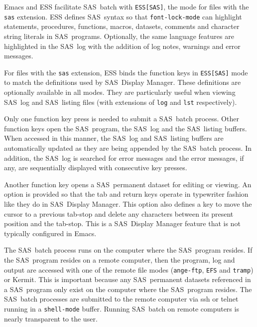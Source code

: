 \documentclass{article}
\newcommand*{\SAS}{\textsc{SAS}}
\newcommand{\stexttt}[1]{{\small\texttt{#1}}}
\newenvironment{Comment}{\begin{quote}\small\itshape }{\end{quote}}
\begin{document}
Emacs and ESS facilitate \SAS\ batch with \stexttt{ESS[SAS]}, the mode 
for files with the \stexttt{sas} extension.  ESS defines \SAS\ syntax so that
\stexttt{font-lock-mode} can highlight statements, procedures,
functions, macros, datasets, comments and character string literals in
\SAS\ programs.  Optionally, the same language features are
highlighted in the \SAS\ log with the addition of log notes, warnings
and error messages.

For files with the \stexttt{sas} extension, ESS binds the function
keys in \stexttt{ESS[SAS]} mode to match the definitions used by \SAS\ 
Display Manager.  These definitions are optionally available in all
modes.   They are particularly useful when viewing \SAS\ log and \SAS\ listing
files (with extensions of \stexttt{log} and \stexttt{lst}
respectively).

Only one function key press is needed to submit a \SAS\ batch process.
Other function keys open the \SAS\ program, the \SAS\ log and the
\SAS\ listing buffers.  When accessed in this manner, the \SAS\ log and 
\SAS\ listing buffers are automatically updated as they are being appended 
by the \SAS\ batch process.  In addition, the \SAS\ log is searched for error
messages and the error messages, if any, are sequentially displayed
with consecutive key presses.

Another function key opens a \SAS\ permanent dataset for editing or
viewing.  An option is provided so that the tab and return keys
operate in typewriter fashion like they do in \SAS\ Display Manager.
This option also defines a key to move the cursor to a previous
tab-stop and delete any characters between its present position and
the tab-stop.  This is a \SAS\ Display Manager feature that is not
typically configured in Emacs.

The \SAS\ batch process runs on the computer where the \SAS\ program
resides.  If the \SAS\ program resides on a remote computer, then the
program, log and output are accessed with one of the remote file modes
(\stexttt{ange-ftp}, \stexttt{EFS} and \stexttt{tramp}) or Kermit.
This is important because any \SAS\ permanent datasets referenced in a
\SAS\ program only exist on the computer where the \SAS\ program
resides.  The \SAS\ batch processes are submitted to the remote
computer via ssh or telnet running in a \stexttt{shell-mode} buffer.
Running \SAS\ batch on remote computers is nearly transparent to the user.

\end{document}
